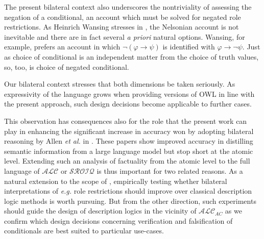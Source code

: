 \documentclass[letterpaper]{article} %
\theoremstyle{definition}
\theoremstyle{definition}
\theoremstyle{definition}
\theoremstyle{definition}
\theoremstyle{definition}
\begin{document}
The present bilateral context also underscores the nontriviality of assessing the negation of a conditional, an account which must be solved for negated role restrictions. As Heinrich Wansing stresses in \cite{DBLP:conf/aiml/Wansing10}, the Nelsonian account is not inevitable and there are in fact several \emph{a priori} natural options. Wansing, for example, prefers an account in which $\neg(\varphi\rightarrow\psi)$ is identified with $\varphi\rightarrow\neg\psi$. Just as choice of conditional is an independent matter from the choice of truth values, so, too, is choice of negated conditional. 

Our bilateral context stresses that both dimensions be taken seriously. As expressivity of the language grows when providing versions of OWL in line with the present approach, such design decisions become applicable to further cases. 


This observation has consequences also for the role that the present work can play in enhancing the significant increase in accuracy won by adopting bilateral reasoning by Allen \emph{et al.} in \cite{DBLP:conf/nesy/AllenCFIG25,allenetal2026}. These papers show improved accuracy in distilling semantic information from a large language model but stop short at the atomic level. Extending such an analysis of factuality from the atomic level to the full language of $\mathcal{ALC}$ or $\mathcal{SROIQ}$ is thus important for two related reasons. As a natural extension to the scope of \cite{DBLP:conf/nesy/AllenCFIG25,allenetal2026}, empirically testing whether bilateral interpretations of \emph{e.g.} role restrictions should improve over classical description logic methods is worth pursuing. But from the other direction, such experiments should guide the design of description logics in the vicinity of $\mathcal{ALC}_{AC}$ as we confirm which design decisions concerning verification and falsification of conditionals are best suited to particular use-cases.



% 


\end{document}
